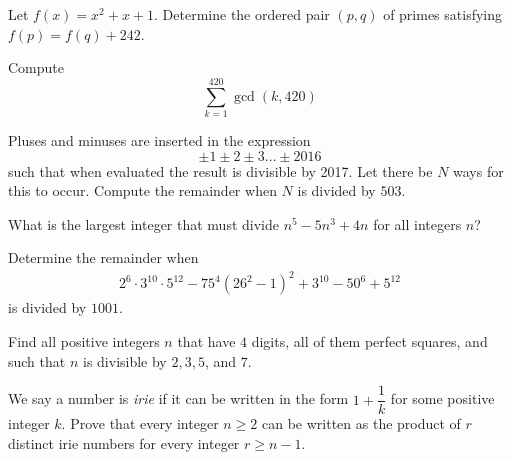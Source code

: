 \begin{problem}
	Let $f(x) = x^2 + x + 1$. Determine the ordered pair $(p,q)$ of primes satisfying $f(p) = f(q) + 242$. %
\end{problem}

\begin{problem}
	Compute \[\sum_{k=1}^{420} \gcd(k,420)\]
\end{problem}

\begin{problem}
	Pluses and minuses are inserted in the expression \[\pm 1 \pm 2 \pm 3 \dots \pm 2016\]such that when evaluated the result is divisible by 2017. Let there be $N$ ways for this to occur. Compute the remainder when $N$ is divided by $503$. %
\end{problem}

\begin{problem}
	What is the largest integer that must divide $n^5-5n^3+4n$ for all integers $n$? %
\end{problem}

\begin{problem}
	Determine the remainder when
		\begin{align*}
			2^6\cdot3^{10}\cdot5^{12}-75^4\left(26^2-1\right)^2+3^{10}-50^6+5^{12}
		\end{align*}
	is divided by $1001$. %
\end{problem}

\begin{problem}[CentroAmerican 2016]
	Find all positive integers $n$ that have $4$ digits, all of them perfect squares, and such that $n$ is divisible by $2, 3, 5$, and $7$. %
\end{problem}

\begin{problem}[CentroAmerican 2016]
	We say a number is \textit{irie} if it can be written in the form $1+\dfrac{1}{k}$ for some positive integer $k$. Prove that every integer $n \geq 2$ can be written as the product of $r$ distinct irie numbers for every integer $r \geq n-1$. %
\end{problem}

